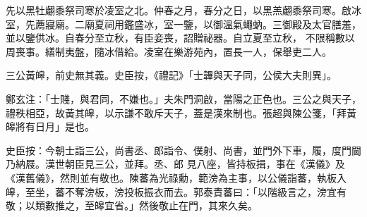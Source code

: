 \begin{pinyinscope}
 先以黑牡翽黍祭司寒於凌室之北。仲春之月，春分之日，以黑羔翽黍祭司寒。啟冰室，先薦寢廟。二廟夏祠用鑑盛冰，室一鑒，以御溫氣蠅蚋。三御殿及太官膳羞，並以鑒供冰。自春分至立秋，有臣妾喪，詔贈祕器。自立夏至立秋，
 不限稱數以周喪事。繕制夷盤，隨冰借給。凌室在樂游苑內，置長一人，保舉吏二人。



 三公黃皞，前史無其義。史臣按，《禮記》「士韠與天子同，公侯大夫則異」。



 鄭玄注：「士賤，與君同，不嫌也。」夫朱門洞啟，當陽之正色也。三公之與天子，禮秩相亞，故黃其皞，以示謙不敢斥天子，蓋是漢來制也。張超與陳公箋，「拜黃皞將有日月」是也。



 史臣按：今朝士詣三公，尚書丞、郎詣令、僕射、尚書，並門外下車，履，度門閫乃納屐。漢世朝臣見三公，並拜。丞、郎
 見八座，皆持板揖，事在《漢儀》及《漢舊儀》，然則並有敬也。陳蕃為光祿勳，範滂為主事，以公儀詣蕃，執板入皞，至坐，蕃不奪滂板，滂投板振衣而去。郭泰責蕃曰：「以階級言之，滂宜有敬；以類數推之，至皞宜省。」然後敬止在門，其來久矣。



\end{pinyinscope}